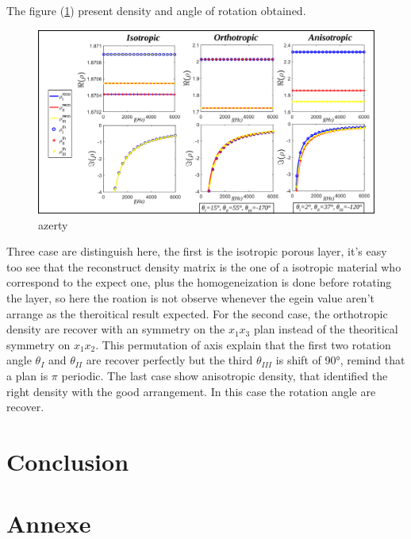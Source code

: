 \documentclass{article}
\begin{document}
    The figure (\ref{Grph_rho_dir}) present density and angle of rotation obtained.

    \begin{figure}[ht!]
        \centering
        \includegraphics[scale=0.4]{Density_dir.png}
        \caption{azerty}
        \label{Grph_rho_dir}
    \end{figure}
    
    Three case are distinguish here, the first is the isotropic porous layer, it's easy too see that the reconstruct density matrix is the one of a isotropic material who correspond to the expect one, plus the homogeneization is done before rotating the layer, so here the roation is not observe whenever the egein value aren't arrange as the theroitical result expected.  For the second case, the orthotropic density are recover with an symmetry on the $x_1x_3$ plan instead of the theoritical symmetry on $x_1x_2$. This permutation of axis explain that the first two rotation angle $\theta_I$ and $\theta_{II}$ are recover perfectly but the third $\theta_{III}$ is shift of 90°, remind that a plan is $\pi$ periodic. The last case show anisotropic density, that identified the right density with the good arrangement. In this case the rotation angle are recover. 
    
\section{Conclusion}


\section{Annexe}
\end{document}
